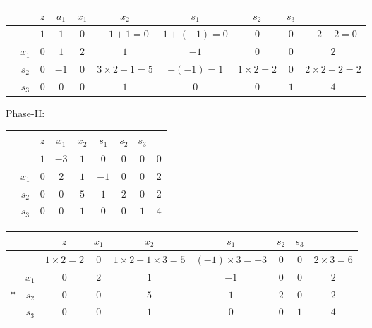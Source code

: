 \documentclass[a4paper,12pt]{article}
\begin{document}
\begin{table}[H]
    \footnotesize
    \begin{tabular}{cc|ccccccc|c}
         &       & $z$ & $a_1$ & $x_1$ & $x_2$                & $s_1$          & $s_2$            & $s_3$ &                      \\
        \hline
         &       & $1$ & $1$   & $0$   & $-1 + 1 = 0$         & $1 + (-1) = 0$ & $0$              & $0$   & $-2 + 2 = 0$         \\
        \hline
         & $x_1$ & $0$ & $1$   & $2$   & $1$                  & $-1$           & $0$              & $0$   & $2$                  \\
         & $s_2$ & $0$ & $-1$  & $0$   & $3 \times 2 - 1 = 5$ & $-(-1) = 1$    & $1 \times 2 = 2$ & $0$   & $2 \times 2 - 2 = 2$ \\
         & $s_3$ & $0$ & $0$   & $0$   & $1$                  & $0$            & $0$              & $1$   & $4$                  \\
    \end{tabular}
\end{table}

Phase-II:
\begin{table}[H]
    \footnotesize
    \begin{tabular}{cc|cccccc|c}
         &       & $z$ & $x_1$ & $x_2$ & $s_1$ & $s_2$ & $s_3$ &     \\
        \hline
         &       & $1$ & $-3$  & $1$   & $0$   & $0$   & $0$   & $0$ \\
        \hline
         & $x_1$ & $0$ & $2$   & $1$   & $-1$  & $0$   & $0$   & $2$ \\
         & $s_2$ & $0$ & $0$   & $5$   & $1$   & $2$   & $0$   & $2$ \\
         & $s_3$ & $0$ & $0$   & $1$   & $0$   & $0$   & $1$   & $4$ \\
    \end{tabular}
\end{table}

\begin{table}[H]
    \footnotesize
    \begin{tabular}{cc|cccccc|c}
            &       & $z$              & $x_1$ & $x_2$                         & $s_1$                & $s_2$ & $s_3$ &                  \\
        \hline
            &       & $1 \times 2 = 2$ & $0$   & $1 \times 2 + 1 \times 3 = 5$ & $(-1) \times 3 = -3$ & $0$   & $0$   & $2 \times 3 = 6$ \\
        \hline
            & $x_1$ & $0$              & $2$   & $1$                           & $-1$                 & $0$   & $0$   & $2$              \\
        $*$ & $s_2$ & $0$              & $0$   & $5$                           & $1$                  & $2$   & $0$   & $2$              \\
            & $s_3$ & $0$              & $0$   & $1$                           & $0$                  & $0$   & $1$   & $4$              \\
    \end{tabular}
\end{table}
\end{document}
